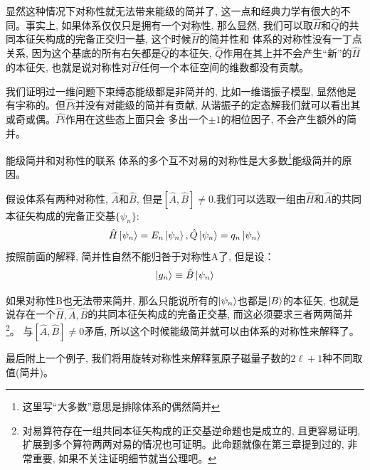 显然这种情况下对称性就无法带来能级的简并了, 这一点和经典力学有很大的不同。事实上, 如果体系仅仅只是拥有一个对称性, 那么显然, 我们可以取$\hat{H}$和$\hat{Q}$的共同本征矢构成的完备正交归一基, 这个时候$\hat{H}$的简并性和
体系的对称性没有一丁点关系, 因为这个基底的所有右矢都是$\hat{Q}$的本征矢, $\hat{Q}$作用在其上并不会产生“新”的$\hat{H}$的本征矢, 也就是说对称性对$\hat{H}$任何一个本征空间的维数都没有贡献。

我们证明过一维问题下束缚态能级都是非简并的, 比如一维谐振子模型, 显然他是有宇称的。但$\hat{Pi}$并没有对能级的简并有贡献, 从谐振子的定态解我们就可以看出其或奇或偶。$\hat{Pi}$作用在这些态上面只会
多出一个$\pm 1 $的相位因子, 不会产生额外的简并。

\begin{proposition}{能级简并和对称性的联系}
    体系的多个互不对易的对称性是大多数\footnote{这里写“大多数”意思是排除体系的偶然简并}能级简并的原因。
\end{proposition}

假设体系有两种对称性, $\hat{A}$和$\hat{B}$, 但是$\left[\hat{A},\hat{B}\right]\neq 0$.我们可以选取一组由$\hat{H}$和$\hat{A}$的共同本征矢构成的完备正交基$\{\psi_n\}$:
\begin{equation}
    \hat{H}\ket{\psi_n}=E_n\ket{\psi_n},\hat{Q}\ket{\psi_n}=q_n\ket{\psi_n}
\end{equation}
按照前面的解释, 简并性自然不能归咎于对称性A了, 但是设：
\[\ket{g_n}\equiv\hat{B}\ket{\psi_n}\]

如果对称性B也无法带来简并, 那么只能说所有的$\ket{\psi_n}$也都是$\ket{B}$的本征矢, 也就是说存在一个$\hat{H},\hat{A},\hat{B}$的共同本征矢构成的完备正交基, 而这必须要求三者两两简并\footnote{对易算符存在一组共同本征矢构成的正交基逆命题也是成立的, 且更容易证明, 扩展到多个算符两两对易的情况也可证明。此命题就像在第三章提到过的, 非常重要, 如果不关注证明细节就当公理吧。}。
与$\left[\hat{A},\hat{B}\right]\neq 0$矛盾, 所以这个时候能级简并就可以由体系的对称性来解释了。

最后附上一个例子, 我们将用旋转对称性来解释氢原子磁量子数的$2\ell+1$种不同取值(简并)。

